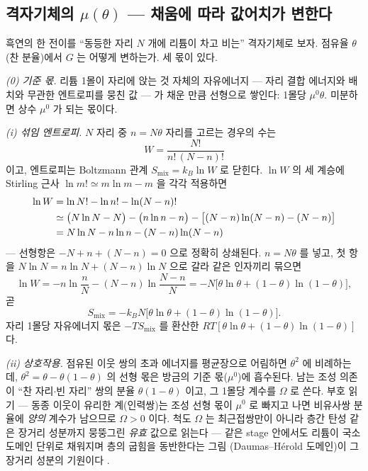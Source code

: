 \documentclass[11pt,a4paper]{article}
\begin{document}
\subsection{격자기체의 $\mu(\theta)$ — 채움에 따라 값어치가 변한다}
흑연의 한 전이를 ``동등한 자리 $N$ 개에 리튬이 차고 비는'' 격자기체로 보자. 점유율 $\theta$(찬 분율)에서
$G$ 는 어떻게 변하는가. 세 몫이 있다.

\emph{(0) 기준 몫.} 리튬 1몰이 자리에 앉는 것 자체의 자유에너지 — 자리 결합 에너지와 배치와 무관한
엔트로피를 뭉친 값 — 가 채운 만큼 선형으로 쌓인다: 1몰당 $\mu^0\theta$. 미분하면 상수 $\mu^0$ 가
되는 몫이다.

\emph{(i) 섞임 엔트로피.} $N$ 자리 중 $n=N\theta$ 자리를 고르는 경우의 수는
\begin{equation}
W=\frac{N!}{n!\,(N-n)!}
\label{eq:W}
\end{equation}
이고, 엔트로피는 Boltzmann 관계 $S_{\mathrm{mix}}=k_B\ln W$ 로 닫힌다. $\ln W$ 의 세 계승에
Stirling 근사 $\ln m!\simeq m\ln m-m$ 을 각각 적용하면
\begin{align}
\ln W&=\ln N!-\ln n!-\ln(N-n)!\notag\\
&\simeq\big(N\ln N-N\big)-\big(n\ln n-n\big)-\big[(N-n)\ln(N-n)-(N-n)\big]
\label{eq:stirlingexp}\\
&=N\ln N-n\ln n-(N-n)\ln(N-n)\notag
\end{align}
— 선형항은 $-N+n+(N-n)=0$ 으로 정확히 상쇄된다. $n=N\theta$ 를 넣고, 첫 항을
$N\ln N=n\ln N+(N-n)\ln N$ 으로 갈라 같은 인자끼리 묶으면
\begin{equation}
\ln W=-n\ln\frac{n}{N}-(N-n)\ln\frac{N-n}{N}
=-N\big[\theta\ln\theta+(1-\theta)\ln(1-\theta)\big],
\label{eq:lnW}
\end{equation}
곧
\begin{equation}
S_{\mathrm{mix}}=-k_BN\big[\theta\ln\theta+(1-\theta)\ln(1-\theta)\big].
\label{eq:smix}
\end{equation}
자리 1몰당 자유에너지 몫은 $-TS_{\mathrm{mix}}$ 를 환산한 $RT[\theta\ln\theta+(1-\theta)\ln(1-\theta)]$ 다.

\emph{(ii) 상호작용.} 점유된 이웃 쌍의 초과 에너지를 평균장으로 어림하면 $\theta^2$ 에 비례하는데,
$\theta^2=\theta-\theta(1-\theta)$ 의 선형 몫은 방금의 기준 몫($\mu^0$)에 흡수된다. 남는 조성
의존이 ``찬 자리$\cdot$빈 자리'' 쌍의 분율 $\theta(1-\theta)$ 이고, 그 1몰당 계수를 $\Omega$ 로
쓴다. 부호 읽기 — 동종 이웃이 유리한 계(인력쌍)는 조성 선형 몫이 $\mu^0$ 로 빠지고 나면 비유사쌍
분율에 \emph{양의} 계수가 남으므로 $\Omega>0$ 이다. 척도 $\Omega$ 는 최근접쌍만이 아니라 층간 탄성 같은 장거리 성분까지 뭉뚱그린 \emph{유효} 값으로
읽는다 — 같은 stage 안에서도 리튬이 국소 도메인 단위로 채워지며 층의 굽힘을 동반한다는 그림
(Daumas--H\'erold 도메인)이 그 장거리 성분의 기원이다 \cite{mckinnon1983}.
\end{document}
